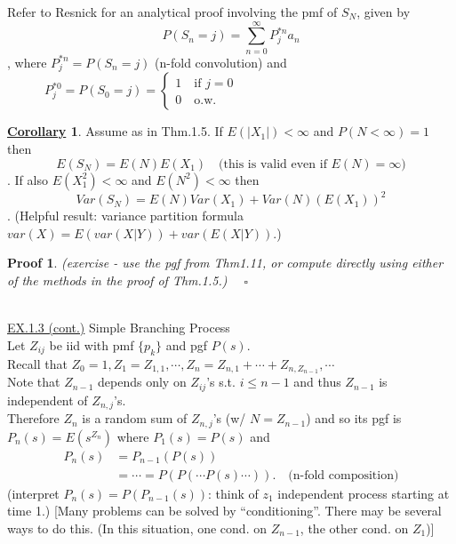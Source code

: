 \documentclass[12pt]{article}
\theoremstyle{definition}
\newtheorem{mycor}{\underline{Corollary}}[section]
\theoremstyle{plain}
\newtheorem*{myproof}{Proof}
\begin{document}
Refer to Resnick for an analytical proof involving the pmf of $S_N$, given by \[P(S_n = j) = \sum_{n=0}^\infty P_j^{*n} a_n\], where $P_j^{*n} = P(S_n = j)$ (n-fold convolution) and \\
$\mbox{}\qquad \quad P_j^{*0} = P(S_0 = j) = \begin{cases} 1 \quad \mbox{if $j=0$} \\ 0 \quad \mbox{o.w.}\end{cases}$
\begin{mycor}
Assume as in Thm.1.5. If $E(|X_1|) < \infty$ and $P(N < \infty) = 1$ then \[E(S_N) = E(N)E(X_1) \quad \mbox{(this is valid even if $E(N) = \infty$})\]. If also $E(X_1^2) < \infty$ and $E(N^2) < \infty$ then \[Var(S_N) = E(N)Var(X_1) + Var(N)(E(X_1))^2\].
(Helpful result: variance partition formula $var(X) = E(var(X|Y)) + var(E(X|Y))$.)
\end{mycor}
\begin{myproof}
(exercise - use the pgf from Thm1.11, or compute directly using either of the methods in the proof of Thm.1.5.) $\quad \square$
\end{myproof}
$\mbox{}$ \\
\underline{EX.1.3 (cont.)} Simple Branching Process \\
Let $Z_{ij}$ be iid with pmf $\{p_k\}$ and pgf $P(s)$. \\
Recall that $Z_0 = 1, Z_1 = Z_{1,1}, \cdots, Z_n = Z_{n,1} + \cdots + Z_{n, Z_{n-1}}, \cdots$ \\
Note that $Z_{n-1}$ depends only on $Z_{ij}$'s s.t. $i \leq n-1$ and thus $Z_{n-1}$ is independent of $Z_{n,j}$'s. \\
Therefore $Z_n$ is a random sum of $Z_{n,j}$'s (w/ $N = Z_{n-1}$) and so its pgf is $P_n(s) = E(s^{Z_n})$ where $P_1(s) = P(s)$ and \begin{displaymath}
\begin{aligned}
P_n(s) &= P_{n-1}(P(s)) \\
&= \cdots = P(P(\cdots P(s) \cdots)). \quad \mbox{(n-fold composition)} 
\end{aligned}
\end{displaymath}
(interpret $P_n(s) = P(P_{n-1}(s))$: think of $z_1$ independent process starting at time 1.) [Many problems can be solved by ``conditioning''. There may be several ways to do this. (In this situation, one cond. on $Z_{n-1}$, the other cond. on $Z_1$)] \\
\end{document}
